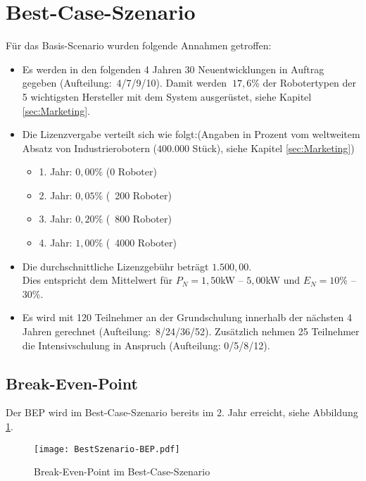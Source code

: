 \section{Best-Case-Szenario}
Für das Basis-Scenario wurden folgende Annahmen getroffen:
\begin{itemize}
	\item Es werden in den folgenden 4 Jahren 30 Neuentwicklungen in Auftrag gegeben (Aufteilung:~4/7/9/10). Damit werden $~17,6$\% der Robotertypen der 5 wichtigsten Hersteller mit dem System ausgerüstet, siehe Kapitel \ref{sec:Marketing}.
	\item Die Lizenzvergabe verteilt sich wie folgt:\newline (Angaben in Prozent vom weltweitem Absatz von Industrierobotern ($400.000$ Stück), siehe Kapitel \ref{sec:Marketing})
	\begin{itemize}
		\item 1. Jahr: $0,00$\% (0 Roboter)
		\item 2. Jahr: $0,05$\% (~200 Roboter)
		\item 3. Jahr: $0,20$\% (~800 Roboter)
		\item 4. Jahr: $1,00$\% (~4000 Roboter)
	\end{itemize}
	\item Die durchschnittliche Lizenzgebühr beträgt $1.500,00$\officialeuro.\\ Dies entspricht dem Mittelwert für $P_N = 1,50$kW -- $5,00$kW und $E_N = 10$\% -- $30$\%.
	\item Es wird mit 120 Teilnehmer an der Grundschulung innerhalb der nächsten 4 Jahren gerechnet (Aufteilung:~8/24/36/52). Zusätzlich nehmen 25 Teilnehmer die Intensivschulung in Anspruch (Aufteilung: 0/5/8/12).
\end{itemize}

\subsection{Break-Even-Point}
Der BEP wird im Best-Case-Szenario bereits im 2. Jahr erreicht, siehe Abbildung \ref{fig:BestSzenario-BEP}.
\begin{figure}[h]
	\centering
	\texttt{[image: BestSzenario-BEP.pdf]}
	\caption{Break-Even-Point im Best-Case-Szenario}
	\label{fig:BestSzenario-BEP}
\end{figure}

